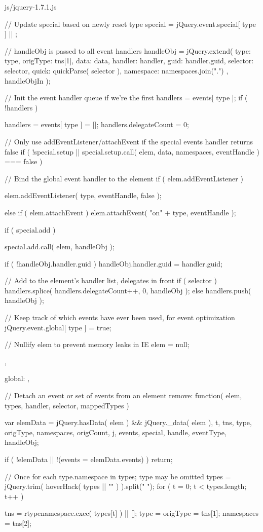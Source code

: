 \documentclass{article}
\begin{document}
\begin{chunk}{js/jquery-1.7.1.js}
{{{{			// Update special based on newly reset type
			special = jQuery.event.special[ type ] || {};

			// handleObj is passed to all event handlers
			handleObj = jQuery.extend({
				type: type,
				origType: tns[1],
				data: data,
				handler: handler,
				guid: handler.guid,
				selector: selector,
				quick: quickParse( selector ),
				namespace: namespaces.join(".")
			}, handleObjIn );

			// Init the event handler queue if we're the first
			handlers = events[ type ];
			if ( !handlers ) {
				handlers = events[ type ] = [];
				handlers.delegateCount = 0;

				// Only use addEventListener/attachEvent if the special events handler returns false
				if ( !special.setup || special.setup.call( elem, data, namespaces, eventHandle ) === false ) {
					// Bind the global event handler to the element
					if ( elem.addEventListener ) {
						elem.addEventListener( type, eventHandle, false );

					} else if ( elem.attachEvent ) {
						elem.attachEvent( "on" + type, eventHandle );
					}
				}
			}

			if ( special.add ) {
				special.add.call( elem, handleObj );

				if ( !handleObj.handler.guid ) {
					handleObj.handler.guid = handler.guid;
				}
			}

			// Add to the element's handler list, delegates in front
			if ( selector ) {
				handlers.splice( handlers.delegateCount++, 0, handleObj );
			} else {
				handlers.push( handleObj );
			}

			// Keep track of which events have ever been used, for event optimization
			jQuery.event.global[ type ] = true;
		}

		// Nullify elem to prevent memory leaks in IE
		elem = null;
	},

	global: {},

	// Detach an event or set of events from an element
	remove: function( elem, types, handler, selector, mappedTypes ) {

		var elemData = jQuery.hasData( elem ) && jQuery._data( elem ),
			t, tns, type, origType, namespaces, origCount,
			j, events, special, handle, eventType, handleObj;

		if ( !elemData || !(events = elemData.events) ) {
			return;
		}

		// Once for each type.namespace in types; type may be omitted
		types = jQuery.trim( hoverHack( types || "" ) ).split(" ");
		for ( t = 0; t < types.length; t++ ) {
			tns = rtypenamespace.exec( types[t] ) || [];
			type = origType = tns[1];
			namespaces = tns[2];

}}}}
\end{chunk}
\end{document}
